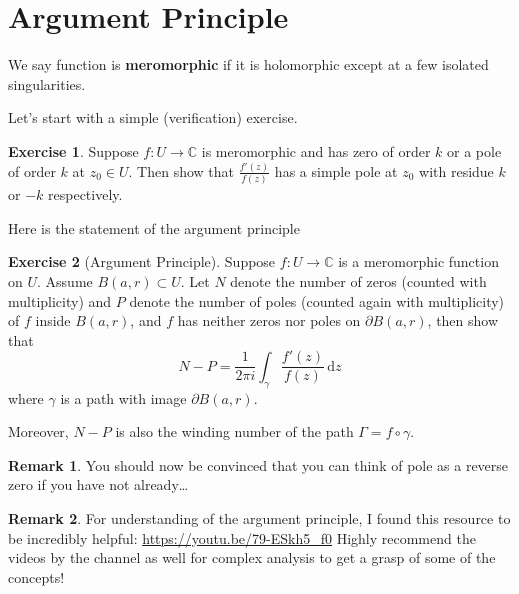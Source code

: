 \documentclass[a4paper, 12pt]{article}
\theoremstyle{definition}
\newtheorem{exercise}{Exercise}
\newtheorem{remark}{Remark}
\numberwithin{theorem}{section}
\numberwithin{definition}{section}
\numberwithin{exercise}{section}
\numberwithin{remark}{section}
\numberwithin{figure}{section}
\numberwithin{example}{section}
\newcommand{\C}{\mathbb{C}}
\newcommand{\intd}{\,\text{d}}
\begin{document}
\section{Argument Principle}
We say function is \textbf{meromorphic} if it is holomorphic except at a few isolated singularities.

Let's start with a simple (verification) exercise.
\begin{exercise}
    Suppose $f:U \rightarrow \C$ is meromorphic and has zero of order $k$ or a pole of order $k$ at $z_0 \in U$.
    Then show that $\frac{f'(z)}{f(z)}$ has a simple pole at $z_0$ with residue $k$ or $-k$ respectively.
\end{exercise}

Here is the statement of the argument principle
\begin{exercise}[Argument Principle]
    Suppose $f:U \rightarrow \C$ is a meromorphic function on $U$.
    Assume $B(a,r) \subset U$.
    Let $N$ denote the number of zeros (counted with multiplicity)
    and $P$ denote the number of poles (counted again with multiplicity)
    of $f$ inside $B(a,r)$,
    and $f$ has neither zeros nor poles on $\partial B(a,r)$, then
    show that
    \begin{equation*}
        N - P = \frac{1}{2\pi i}\int_{\gamma} \frac{f'(z)}{f(z)} \intd z
    \end{equation*}
    where $\gamma$ is a path with image $\partial B (a,r)$.

    Moreover, $N-P$ is also the winding number of the path $\Gamma = f \circ \gamma$.
\end{exercise}
\begin{remark}
    You should now be convinced that you can think of pole as a reverse zero if you have not already\dots
\end{remark}
\begin{remark}
    For understanding of the argument principle,
    I found this resource to be incredibly helpful:
    \url{https://youtu.be/79-ESkh5\_f0}
    Highly recommend the videos by the channel as well for complex analysis to get a grasp of some of the concepts!
\end{remark}
\end{document}
